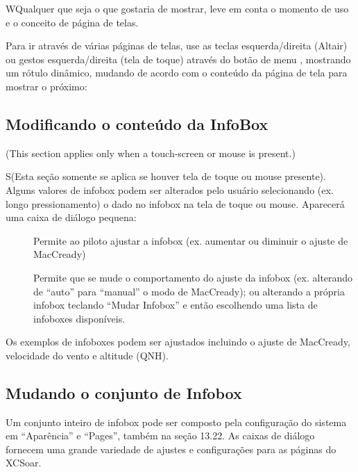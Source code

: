 WQualquer que seja o que gostaria de mostrar, leve em conta o momento de uso e o conceito de página de telas.

Para ir através de várias páginas de telas, use as teclas esquerda/direita (Altair) ou gestos esquerda/direita (tela de toque) através do botão de menu , mostrando um rótulo dinâmico, mudando de acordo com o conteúdo da página de tela para mostrar o próximo:

\blink{}\blink{}\blink{}\blink{}


\subsection*{Modificando o conteúdo da InfoBox }

(This section applies only when a touch-screen or mouse is present.)

S(Esta seção somente se aplica se houver tela de toque ou mouse presente).  Alguns valores de infobox podem ser alterados pelo usuário selecionando (ex. longo pressionamento) o dado no infobox na tela de toque ou mouse.  Aparecerá uma caixa de diálogo pequena:

\begin{description}
\item[]  
Permite ao piloto ajustar a infobox (ex. aumentar ou diminuir o ajuste de MacCready)

\item[]
 Permite que se mude o comportamento do ajuste da infobox (ex. alterando de “auto” para “manual” o modo de MacCready); ou alterando a própria infobox teclando “Mudar Infobox” e então escolhendo uma lista de infoboxes disponíveis.

\end{description}

Os exemplos de infoboxes podem ser ajustados incluindo o ajuste de MacCready, velocidade do vento e altitude (QNH).


\subsection*{Mudando o conjunto de Infobox}

Um conjunto inteiro de infobox pode ser composto pela configuração do sistema em “Aparência” e “Pages”, também na seção 13.22.  As caixas de diálogo fornecem uma grande variedade de ajustes e configurações para as páginas do XCSoar.


